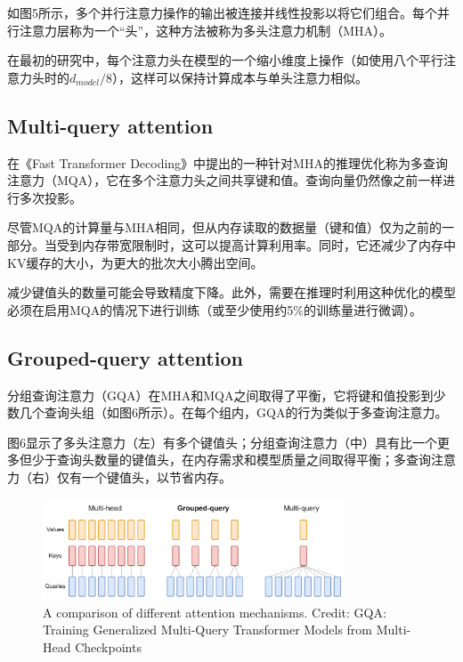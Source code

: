 \documentclass[twocolumn, 10pt]{article} %
\theoremstyle{remark}
\begin{document}
如图5所示，多个并行注意力操作的输出被连接并线性投影以将它们组合。每个并行注意力层称为一个“头”，这种方法被称为多头注意力机制（MHA）。

在最初的研究中，每个注意力头在模型的一个缩小维度上操作（如使用八个平行注意力头时的$d_{model}/8$），这样可以保持计算成本与单头注意力相似。




\subsection{Multi-query attention}


在《Fast Transformer Decoding》中提出的一种针对MHA的推理优化称为多查询注意力（MQA），它在多个注意力头之间共享键和值。查询向量仍然像之前一样进行多次投影。

尽管MQA的计算量与MHA相同，但从内存读取的数据量（键和值）仅为之前的一部分。当受到内存带宽限制时，这可以提高计算利用率。同时，它还减少了内存中KV缓存的大小，为更大的批次大小腾出空间。

减少键值头的数量可能会导致精度下降。此外，需要在推理时利用这种优化的模型必须在启用MQA的情况下进行训练（或至少使用约5\%的训练量进行微调）。



\subsection{Grouped-query attention}

分组查询注意力（GQA）在MHA和MQA之间取得了平衡，它将键和值投影到少数几个查询头组（如图6所示）。在每个组内，GQA的行为类似于多查询注意力。

图6显示了多头注意力（左）有多个键值头；分组查询注意力（中）具有比一个更多但少于查询头数量的键值头，在内存需求和模型质量之间取得平衡；多查询注意力（右）仅有一个键值头，以节省内存。

\begin{figure}[ht]
    \centering
    \includegraphics[width=0.8\textwidth]{comparison-attention-mechanisms.png}
    \caption{A comparison of different attention mechanisms. Credit: GQA: Training Generalized Multi-Query Transformer Models from Multi-Head Checkpoints}
\end{figure}
\end{document}

